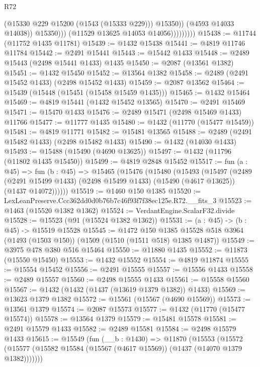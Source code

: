 \begin{lexlean}{R72}
\begin{coremodule}
                                (@15330 @229 @15200 (@1543 (@15333 @229)))
                                @15350))
                            (@4593 @14033 @14038))
                          @15350)))
                    (@11529 @13625 @14053 @14056)))))))))
@15438 := @11744 (@11752 @1435 @11781)
@15439 := @1432 @15438
@15441 := @4819 @11746 @11784
@15442 := @2491 @15441
@15443 := @15442 @1433
@15448 := @2489 @15443 (@2498 @15441 @1433) @1435
@15450 := @2087 (@13561 @1382)
@15451 := @1432 @15450
@15452 := @13564 @1382
@15458 := @2489 (@2491 @15452 @1433) (@2498 @15452 @1433)
@15459 := @2087 @13562
@15464 := @15439 (@15448 (@15451 (@15458 @15459 @1435)))
@15465 := @1432 @15464
@15469 := @4819 @15441 (@1432 @15452 @13565)
@15470 := @2491 @15469
@15471 := @15470 @1433
@15476 := @2489 @15471 (@2498 @15469 @1433) @11766
@15477 := @11777 @1435
@15480 := @1432 (@11770 (@15477 @15459))
@15481 := @4819 @11771
@15482 := @15481 @13565
@15488 := @2489 (@2491 @15482 @1433) (@2498 @15482 @1433)
@15490 := @1432 (@14030 @1433)
@15493 := @15488 (@15490 (@4690 @13625))
@15497 := @1432 (@11796 (@11802 @1435 @15450))
@15499 := @4819 @2848 @15452
@15517 := fun (a : @45) =>
  fun (b : @45) =>
  @15465
    (@15476
      (@15480
        (@15493
          (@15497
            (@2489
              (@2491 @15499 @1433)
              (@2498 @15499 @1433)
              (@15490 (@4617 @13625))
              (@1437 @14072))))))
@15519 := @1460 @150 @1385
@15520 := LexLeanPreserve.Ccc362dd0d0b76b7c46f93f7f38ec125e.R72.__fits_3
@15523 := @1463 (@15520 @1382 @1362)
@15524 := VerdantEngine.ScalarF32.divide
@15528 := @15523 (@91 (@15524 @1382 @1362))
@15531 := (a : @45) -> (b : @45) -> @15519 @15528
@15545 := @1472
    @150
    @1385
    @15528
    @518
    @3964
    (@1493 (@1503 @150))
    (@1509 (@1510 (@1511 @518) @1385 @1487))
@15549 := @3975 @478 @380 @516 @15464
@15550 := @11880 @1435
@15552 := @11873 (@15550 @15450)
@15553 := @1432 @15552
@15554 := @4819 @11874
@15555 := @15554 @15452
@15556 := @2491 @15555
@15557 := @15556 @1433
@15558 := @2489 @15557
@15560 := @2498 @15555 @1433
@15561 := @15558 @15560
@15567 := @1432 (@1432 (@1437 (@13619 @1379 @1382)) @1433)
@15569 := @13623 @1379 @1382
@15572 := @15561 (@15567 (@4690 @15569))
@15573 := @13561 @1379
@15574 := @2087 @15573
@15577 := @1432 (@11770 (@15477 @15574))
@15578 := @13564 @1379
@15579 := @15481 @15578
@15581 := @2491 @15579 @1433
@15582 := @2489 @15581
@15584 := @2498 @15579 @1433
@15615 := @15549
    (fun (__b : @1430) =>
    @11870
      (@15553
        (@15572 (@15577 (@15582 @15584 (@15567 (@4617 @15569)) (@1437 (@14070 @1379 @1382)))))))

\end{coremodule}
\end{lexlean}
